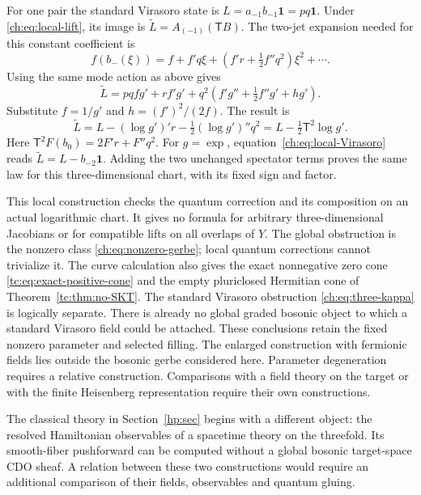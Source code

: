 For one pair the standard Virasoro state is
$L=a_{-1}b_{-1}\mathbf1=pq\mathbf1$.
Under \eqref{ch:eq:local-lift}, its image is
$\widetilde L=A_{(-1)}(\mathsf T B)$.
The two-jet expansion needed for this constant coefficient is
\[
 f(b_-(\xi))
   =f+f'q\xi+\left(f'r+\tfrac12f''q^2\right)\xi^2+\cdots.
\]
Using the same mode action as above gives
\begin{equation}\label{ch:eq:Virasoro-mode-calculation}
 \widetilde L
   =pqfg'+rf'g'
            +q^2\left(f'g''+\tfrac12f''g'+hg'\right).
\end{equation}
Substitute $f=1/g'$ and $h=(f')^2/(2f)$.
The result is
\begin{equation}\label{ch:eq:local-Virasoro}
       \widetilde L
         =L-(\log g')'r-\tfrac12(\log g')''q^2
         =L-\tfrac12\mathsf T^2\log g'.
\end{equation}
Here $\mathsf T^2F(b_0)=2F'r+F''q^2$.
For $g=\exp$, equation~\eqref{ch:eq:local-Virasoro} reads
$\widetilde L=L-b_{-2}\mathbf1$.
Adding the two unchanged spectator terms proves the same law
for this three-dimensional chart, with its fixed sign and factor.

This local construction checks the quantum correction and its
composition on an actual logarithmic chart.
It gives no formula for arbitrary three-dimensional Jacobians
or for compatible lifts on all overlaps of $Y$.
The global obstruction is the nonzero class
\eqref{ch:eq:nonzero-gerbe}; local quantum corrections cannot
trivialize it. The curve calculation also gives the exact
nonnegative zero cone \eqref{tc:eq:exact-positive-cone} and
the empty pluriclosed Hermitian cone of
Theorem~\ref{tc:thm:no-SKT}.
The standard Virasoro obstruction \eqref{ch:eq:three-kappa}
is logically separate. There is already no global graded
bosonic object to which a standard Virasoro field could be attached.
These conclusions retain the fixed nonzero parameter and selected
filling. The enlarged construction with fermionic fields lies
outside the bosonic gerbe considered here.
Parameter degeneration requires a relative construction.
Comparisons with a field theory on the target or with the finite
Heisenberg representation require their own constructions.

The classical theory in Section~\ref{hp:sec} begins with a different
object: the resolved Hamiltonian observables of a spacetime theory
on the threefold. Its smooth-fiber pushforward can be computed
without a global bosonic target-space CDO sheaf. A relation between
these two constructions would require an additional comparison
of their fields, observables and quantum gluing.
